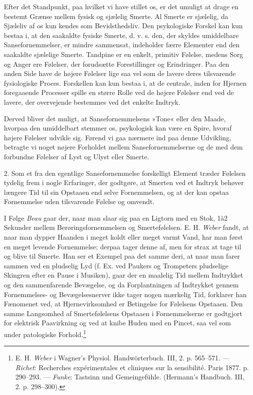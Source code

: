 \documentclass[12pt,a4paper,openany]{book}
\newcommand{\opage}[1]{\marginnote{\footnotesize\textit{[#1]}}}
\begin{document}
Efter det Standpunkt, paa hvilket vi have stillet os, er det umuligt at
drage en bestemt Grænse mellem fysisk og sjælelig Smerte. Al Smerte er
sjælelig, da Sjæleliv af os kun kendes som Bevidsthedsliv. Den
psykologiske Forskel kan kun bestaa i, at den saakaldte fysiske Smerte,
d. v. s. den, der skyldes umiddelbare Sansefornemmelser, er mindre
sammensat, indeholder færre Elementer end den saakaldte sjælelige
Smerte. Tandpine er en enkelt, primitiv Følelse, medens Sorg og Anger
ere Følelser, der forudsætte Forestillinger og Erindringer. Paa den
anden Side have de højere Følelser lige saa vel som de lavere deres
tilsvarende fysiologiske Proces. Forskellen kan kun bestaa i, at de
centrale, inden for Hjernen foregaaende Processer spille en større Rolle
ved de højere Følelser end ved de lavere, der overvejende bestemmes ved
det enkelte Indtryk.

Derved bliver det muligt, at Sansefornemmelsens »Tone« eller den Maade,
hvorpaa den umiddelbart stemmer os, psykologisk kan være en Spire,
hvoraf højere Følelser udvikle sig. Førend vi gaa nærmere ind paa denne
Udvikling, betragte vi noget nøjere Forholdet mellem Sansefornemmelserne
og de med dem forbundne Følelser af Lyst og Ulyst eller Smerte.

2. Som et fra den egentlige Sansefornemmelse forskelligt Element træder
Følelsen tydelig frem i nogle Erfaringer, der godtgøre, at Smerten ved
et Indtryk behøver længere Tid til
\opage{270}sin Opstaaen end selve Fornemmelsen, og at der kan opstaa
Fornemmelse uden tilsvarende Følelse og omvendt.

I Følge \emph{Beau} gaar der, naar man slaar sig paa en Ligtorn med en
Stok, 1à2 Sekunder mellem Berøringsfornemmelsen og Smertefølelsen. E. H.
\emph{Weber} fandt, at naar man dypper Haanden i meget koldt eller meget
varmt Vand, har man først en meget levende Fornemmelse; derpaa tager
denne af, men for strax at tage til og blive til Smerte. Han ser et
Exempel paa det samme deri, at naar man farer sammen ved en pludselig
Lyd (f. Ex. ved Paukers og Trompeters pludselige Skingren efter en Pause
i Musiken), gaar der en maalelig Tid mellem Indtrykket og den
sammenfarende Bevægelse, og da Forplantningen af Indtrykket gennem
Fornemmelses- og Bevægelsesnerver ikke tager nogen mærkelig Tid,
forklarer han Fænomenet ved, at Hjernevirksomhed er Betingelse for
Følelsens Opstaaen. Den samme Langsomhed af Smertefølelsens Opstaaen i
Fornemmelserne er godtgjort for elektrisk Paavirkning og ved at knibe
Huden med en Pincet, saa vel som under patologiske
Forhold.\footnote[1]{E. H. \emph{Weber} i Wagner’s Physiol.
Handwörterbuch. III, 2. p. 565--571. --- \emph{Richet}: Recherches
expérimentales et cliniques sur la sensibilité. Paris 1877. p. 290--293.
--- \emph{Funke}: Tastsinn und Gemeingefühle. (Hermann’s Handbuch. III,
2. p. 298--300).}
\end{document}
